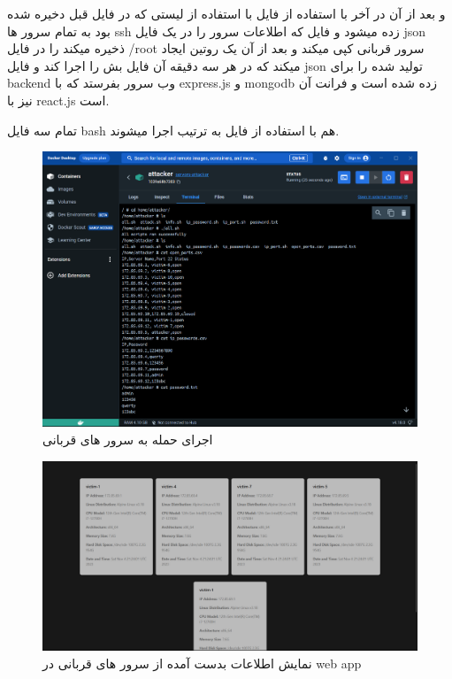 \documentclass{article}
\begin{document}
و بعد از آن در آخر با استفاده از فایل  با استفاده از لیستی که در فایل قبل دخیره شده بود به تمام سرور ها ssh زده میشود و فایل  که اطلاعات سرور را در یک فایل json ذخیره میکند را در فایل /root سرور قربانی کپی میکند و بعد از آن یک روتین ایجاد میکند که در هر سه دقیقه آن فایل بش را اجرا کند و فایل json تولید شده را برای backend  وب سرور بفرستد که با express.js و mongodb زده شده است و فرانت آن نیز با react.js است.

تمام سه فایل bash هم با استفاده از فایل  به ترتیب اجرا میشوند.


\begin{figure}[H]
  \centering
  \includegraphics[width=15cm]{pic/docker.png}
  \caption{اجرای حمله به سرور های قربانی}
  \label{fig:docker}
\end{figure}

\begin{figure}[H]
  \centering
  \includegraphics[width=15cm]{pic/front.png}
  \caption{نمایش اطلاعات بدست آمده از سرور های قربانی در web app}
  \label{fig:docker}
\end{figure}
\end{document}
